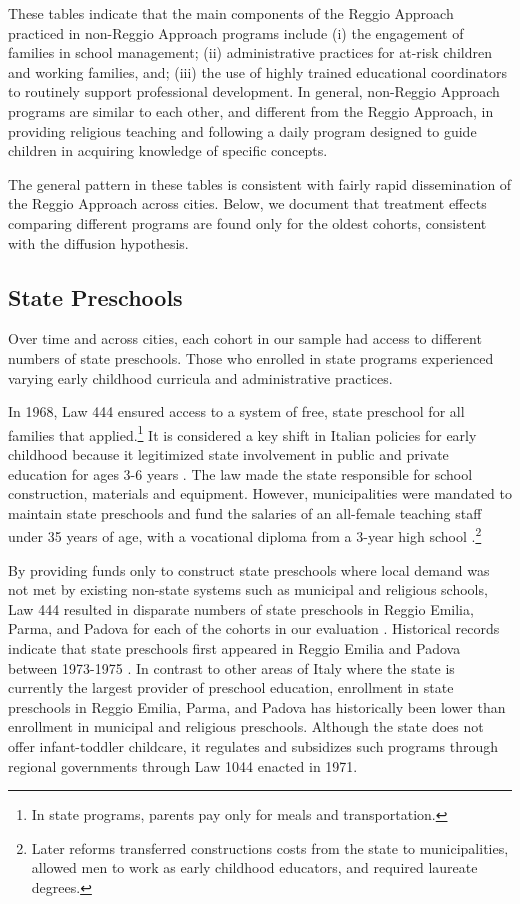 These tables indicate that the main components of the Reggio Approach practiced in non-Reggio Approach programs include (i) the engagement of families in school management; (ii) administrative practices for at-risk children and working families, and; (iii) the use of highly trained educational coordinators to routinely support professional development. In general, non-Reggio Approach programs are similar to each other, and different from the Reggio Approach, in providing religious teaching and following a daily program designed to guide children in acquiring knowledge of specific concepts.

The general pattern in these tables is consistent with fairly rapid dissemination of the Reggio Approach across cities. Below, we document that treatment effects comparing different programs are found only for the oldest cohorts, consistent with the diffusion hypothesis.

\subsection{State Preschools}

Over time and across cities, each cohort in our sample had access to different numbers of state preschools. Those who enrolled in state programs experienced varying early childhood curricula and administrative practices.

In 1968, Law 444 ensured access to a system of free, state preschool for all families that applied.\footnote{In state programs, parents pay only for meals and transportation.} It is considered a key shift in Italian policies for early childhood because it legitimized state involvement in public and private education for ages 3-6 years \citep{Hohnerlein_2009_Paradox-Public-Preschools}. The law made the state responsible for school construction, materials and equipment. However, municipalities were mandated to maintain state preschools and fund the salaries of an all-female teaching staff under 35 years of age, with a vocational diploma from a 3-year high school \citep{OECD_2001_Italy-Country-Note}.\footnote{Later reforms transferred constructions costs from the state to municipalities, allowed men to work as early childhood educators, and required laureate degrees.}

By providing funds only to construct state preschools where local demand was not met by existing non-state systems such as municipal and religious schools, Law 444 resulted in disparate numbers of state preschools in Reggio Emilia, Parma, and Padova for each of the cohorts in our evaluation \citep{Hohnerlein_2009_Paradox-Public-Preschools}. Historical records indicate that state preschools first appeared in Reggio Emilia and Padova between 1973-1975 \citep{Padova-Admin-Data_1964-2011,Reggio-Admin-data_1966-2006,Reggio-Annual-Journals_1994-2011}. In contrast to other areas of Italy where the state is currently the largest provider of preschool education, enrollment in state preschools in Reggio Emilia, Parma, and Padova has historically been lower than enrollment in municipal and religious preschools. Although the state does not offer infant-toddler childcare, it regulates and subsidizes such programs through regional governments through Law 1044 enacted in 1971.

